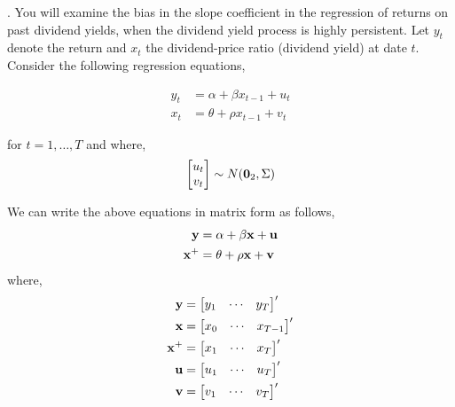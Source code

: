 \citep{stambaugh1999predictive}. You will examine the bias in the slope coefficient in the regression of returns on past dividend yields, when the dividend yield process is highly persistent. Let \(y_t\) denote the return and \(x_t\) the dividend-price ratio (dividend yield) at date \(t\). Consider the following regression equations,

\begin{align*}
    y_t &= \alpha + \beta x_{t-1} + u_t \\
    x_t &= \theta + \rho x_{t-1} + v_t
\end{align*}

for \(t = 1, \dots, T\) and where,
\[
    \begin{bmatrix} u_t \\ v_t \end{bmatrix} \sim N(\mathbf{0}_2, \Sigma)
\]

We can write the above equations in matrix form as follows,
\begin{align*}
    \mathbf{y} & = \alpha + \beta\mathbf{x} + \mathbf{u} \\ 
    \mathbf{x}^{+} & = \theta + \rho\mathbf{x} + \mathbf{v}
\end{align*}
where,
\begin{align*}
    \mathbf{y} & = \begin{bmatrix} y_1 & \cdots & y_T \end{bmatrix}^\prime \\
    \mathbf{x} & = \begin{bmatrix} x_0 & \cdots & x_{T-1} \end{bmatrix}^\prime \\
    \mathbf{x}^{+}  & = \begin{bmatrix} x_1 & \cdots & x_T \end{bmatrix}^\prime \\
    \mathbf{u} & = \begin{bmatrix} u_1 & \cdots & u_T \end{bmatrix}^\prime \\
    \mathbf{v} & = \begin{bmatrix} v_1 & \cdots & v_T \end{bmatrix}^\prime \\
\end{align*}

